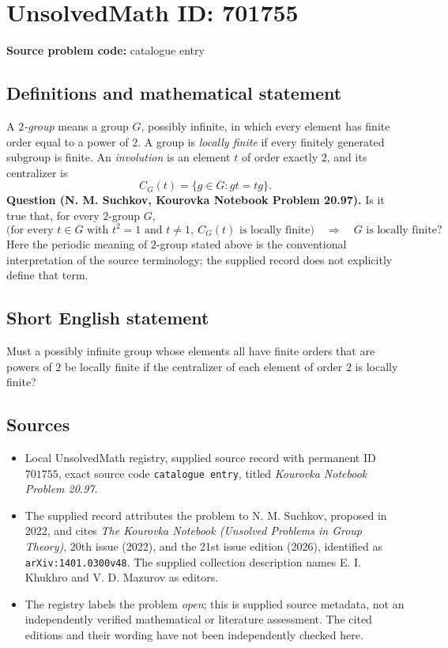 \documentclass[11pt]{article}
\begin{document}
\section*{UnsolvedMath ID: 701755}
\textbf{Source problem code:} catalogue entry
\subsection{Definitions and mathematical statement}
A \emph{\(2\)-group} means a group \(G\), possibly infinite, in which every element has finite order equal to a power of \(2\). A group is \emph{locally finite} if every finitely generated subgroup is finite. An \emph{involution} is an element \(t\) of order exactly \(2\), and its centralizer is
\[
C_G(t)=\{g\in G:gt=tg\}.
\]
\textbf{Question (N. M. Suchkov, Kourovka Notebook Problem 20.97).} Is it true that, for every \(2\)-group \(G\),
\[
\bigl(\text{for every }t\in G\text{ with }t^2=1\text{ and }t\ne1,
\ C_G(t)\text{ is locally finite}\bigr)
\quad\Longrightarrow\quad
G\text{ is locally finite}?
\]
Here the periodic meaning of \(2\)-group stated above is the conventional interpretation of the source terminology; the supplied record does not explicitly define that term.
\subsection{Short English statement}
Must a possibly infinite group whose elements all have finite orders that are powers of \(2\) be locally finite if the centralizer of each element of order \(2\) is locally finite?
\subsection{Sources}
\begin{itemize}
\item Local UnsolvedMath registry, supplied source record with permanent ID \(701755\), exact source code \texttt{catalogue entry}, titled \emph{Kourovka Notebook Problem 20.97}.
\item The supplied record attributes the problem to N. M. Suchkov, proposed in 2022, and cites \emph{The Kourovka Notebook (Unsolved Problems in Group Theory)}, 20th issue (2022), and the 21st issue edition (2026), identified as \texttt{arXiv:1401.0300v48}. The supplied collection description names E. I. Khukhro and V. D. Mazurov as editors.
\item The registry labels the problem \emph{open}; this is supplied source metadata, not an independently verified mathematical or literature assessment. The cited editions and their wording have not been independently checked here.
\end{itemize}
\end{document}
